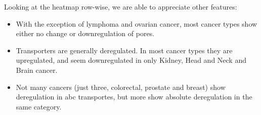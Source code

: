 Looking at the heatmap row-wise, we are able to appreciate other features:
\begin{itemize}
    \item With the exception of lymphoma and ovarian cancer, most cancer types show either no change or downregulation of pores.
    \item Transporters are generally deregulated.
    In most cancer types they are upregulated, and seem downregulated in only Kidney, Head and Neck and Brain cancer.
    \item Not many cancers (just three, colorectal, prostate and breast) show deregulation in \gls{abc} transportes, but more show absolute deregulation in the same category.
\end{itemize}